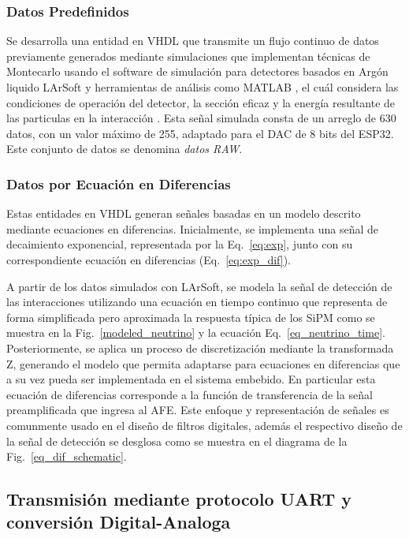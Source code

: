             \subsubsection{Datos Predefinidos} Se desarrolla una entidad en VHDL que transmite un flujo continuo de datos previamente generados mediante simulaciones que implementan técnicas de Montecarlo usando el software de simulación para detectores basados en Argón liquido LArSoft y herramientas de análisis como MATLAB \cite{SiPMmatlab}, el cuál considera las condiciones de operación del detector, la sección eficaz y la energía resultante de las particulas en la interacción \cite{LArSoft}. Esta señal simulada consta de un arreglo de 630 datos, con un valor máximo de 255, adaptado para el DAC de 8 bits del ESP32. Este conjunto de datos se denomina  \textit{datos RAW}.
            
            \subsubsection{Datos por Ecuación en Diferencias} Estas entidades en VHDL generan señales basadas en un modelo descrito mediante ecuaciones en diferencias. Inicialmente, se implementa una señal de decaimiento exponencial, representada por la Eq.~\ref{eq:exp}, junto con su correspondiente ecuación en diferencias (Eq.~\ref{eq:exp_dif}).
            
            A partir de los datos simulados con LArSoft, se modela la señal de detección de las interacciones utilizando una ecuación en tiempo continuo que representa de forma simplificada pero aproximada la respuesta típica de los SiPM como se muestra en la Fig.~\ref{modeled_neutrino} y la ecuación Eq.~\ref{eq_neutrino_time}. Posteriormente, se aplica un proceso de discretización mediante la transformada Z, generando el modelo que permita adaptarse para ecuaciones en diferencias que a su vez pueda ser implementada en el sistema embebido. En particular esta ecuación de diferencias corresponde a la función de transferencia de la señal preamplificada que ingresa al AFE. Este enfoque y representación de señales es comunmente usado en el diseño de filtros digitales, además el respectivo diseño de la señal de detección se desglosa como se muestra en el diagrama de la Fig.~\ref{eq_dif_schematic}.
        
    \subsection {Transmisión mediante protocolo UART y conversión Digital-Analoga}
        
